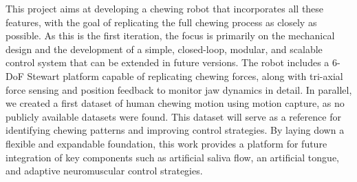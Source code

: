 This project aims at developing a chewing robot that incorporates all these features, with the goal of replicating the full chewing process as closely as 
possible. As this is the first iteration, the focus is primarily on the mechanical design and the development of a simple, closed-loop, modular, and scalable 
control system that can be extended in future versions. The robot includes a 6-DoF Stewart platform capable of replicating chewing forces, along with 
tri-axial force sensing and position feedback to monitor jaw dynamics in detail. In parallel, we created a first dataset of human chewing motion using 
motion capture, as no publicly available datasets were found. This dataset will serve as a reference for identifying chewing patterns and 
improving control strategies. By laying down a flexible and expandable foundation, this work provides a platform for future integration of key components 
such as artificial saliva flow, an artificial tongue, and adaptive neuromuscular control strategies.\\
